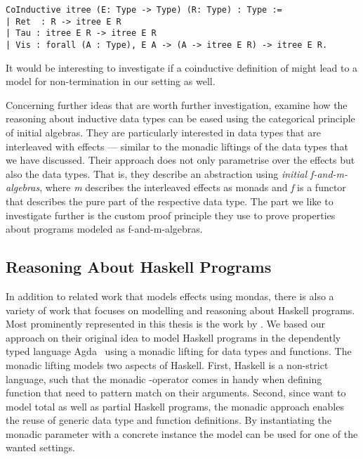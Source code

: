 \begin{verbatim}
CoInductive itree (E: Type -> Type) (R: Type) : Type :=
| Ret  : R -> itree E R
| Tau : itree E R -> itree E R
| Vis : forall (A : Type), E A -> (A -> itree E R) -> itree E R.
\end{verbatim}

It would be interesting to investigate if a coinductive definition of
 might lead to a model for non-termination in our setting
as well.

Concerning further ideas that are worth further investigation,
\citet{atkey2015interleaving} examine how the reasoning about
inductive data types can be eased using the categorical principle of
initial algebras.
They are particularly interested in data types that are interleaved
with effects --- similar to the monadic liftings of the data types
that we have discussed.
Their approach does not only parametrise over the effects but also the
data types.
That is, they describe an abstraction using \emph{initial
  f-and-m-algebras}, where \emph{m} describes the interleaved
effects as monads and \emph{f} is a functor that describes the pure
part of the respective data type.
The part we like to investigate further is the custom proof principle
they use to prove properties about programs modeled as
f-and-m-algebras.


\subsection{Reasoning About Haskell Programs}

In addition to related work that models effects using mondas, there is
also a variety of work that focuses on modelling and reasoning about
Haskell programs.
Most prominently represented in this thesis is the work by
\citet{abel2005verifying}.
We based our approach on their original idea to model Haskell programs
in the dependently typed language Agda~\citep{norell2008dependently}
using a monadic lifting for data types and functions.
The monadic lifting models two aspects of Haskell.
First, Haskell is a non-strict language, such that the monadic
\hinl{>>=}-operator comes in handy when defining function that need to
pattern match on their arguments.
Second, since \citeauthor{abel2005verifying} want to model total as well as
partial Haskell programs, the monadic approach enables the reuse of
generic data type and function definitions.
By instantiating the monadic parameter with a concrete instance the
model can be used for one of the wanted settings.

